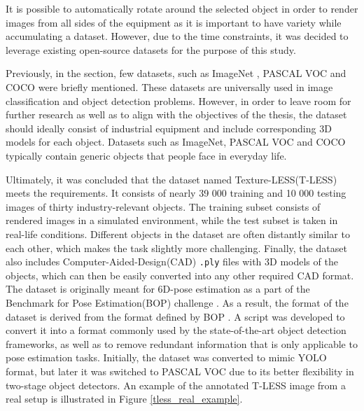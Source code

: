 It is possible to automatically rotate around the selected object in order to render images from all sides of the equipment as it is important to have variety while accumulating a dataset. However, due to the time constraints, it was decided to leverage existing open-source datasets for the purpose of this study. 

Previously, in the  section, few datasets, such as ImageNet \cite{Russakovsky2014}, PASCAL VOC \cite{Everingham10} and COCO \cite{Lin2014} were briefly mentioned. These datasets are universally used in image classification and object detection problems. However, in order to leave room for further research as well as to align with the objectives of the thesis, the dataset should ideally consist of industrial equipment and include corresponding 3D models for each object. Datasets such as ImageNet, PASCAL VOC and COCO typically contain generic objects that people face in everyday life. 

Ultimately, it was concluded that the dataset named Texture-LESS(T-LESS)  \cite{hodan2017tless} meets the requirements. It consists of nearly 39 000 training and 10 000 testing images of thirty industry-relevant objects. The training subset consists of rendered images in a simulated environment, while the test subset is taken in real-life conditions.  Different objects in the dataset are often distantly similar to each other, which makes the task slightly more challenging. Finally, the dataset also includes Computer-Aided-Design(CAD) \texttt{.ply} files with 3D models of the objects, which can then be easily converted into any other required CAD format. The dataset is originally meant for 6D-pose estimation \cite{hodan2017tless} as a part of the Benchmark for Pose Estimation(BOP) challenge \cite{hodan2018bop}. As a result, the format of the dataset is derived from the format defined by BOP \cite{hodan2018bop_format}. A script was developed to convert it into a format commonly used by the state-of-the-art object detection frameworks, as well as to remove redundant information that is only applicable to pose estimation tasks. Initially, the dataset was converted to mimic YOLO \cite{Redmon2015a} format, but later it was switched to PASCAL VOC due to its better flexibility in two-stage object detectors. An example of the annotated T-LESS image from a real setup is illustrated in Figure \ref{tless_real_example}. 

